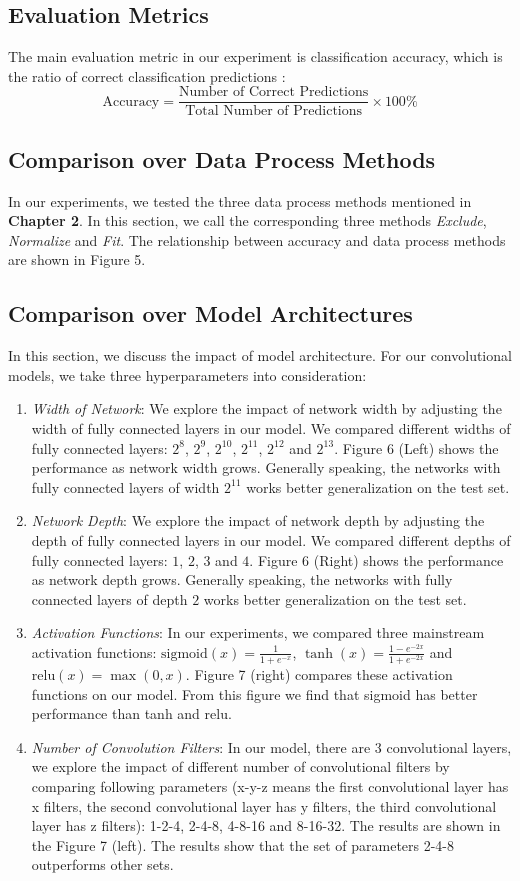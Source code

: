 \documentclass[a4paper, 11pt]{article} %
\begin{document}
\subsection{Evaluation Metrics}
The main evaluation metric in our experiment is classification accuracy, which is the ratio of correct classification predictions :
\[
	\text{Accuracy} = \frac{\text{Number of Correct Predictions}}{\text{Total Number of  Predictions}} \times 100\%
\]
\subsection{Comparison over Data Process Methods}
In our experiments, we tested the three data process methods mentioned in \textbf{Chapter 2}. In this section, we call the corresponding three methods \textit{Exclude}, \textit{Normalize} and \textit{Fit}. The relationship between accuracy and data process methods are shown in Figure 5.
\subsection{Comparison over Model Architectures}
In this section, we discuss the impact of model architecture. For our convolutional models, we take three hyperparameters into consideration:
\begin{enumerate}
	\item \textit{Width of Network}: We explore the impact of network width by adjusting the width of fully connected layers in our model. We compared different widths of fully connected layers:  $2^8$, $2^9$, $2^{10}$, $2^{11}$, $2^{12}$ and $2^{13}$. Figure 6 (Left) shows the performance as network width grows. Generally speaking, the networks with fully connected layers of width $2^{11}$ works better generalization on the test set.
	\item \textit{Network Depth}: We explore the impact of network depth by adjusting the depth of fully connected layers in our model. We compared different depths of fully connected layers:  $1$, $2$, $3$ and $4$. Figure 6 (Right) shows the performance as network depth grows. Generally speaking, the networks with fully connected layers of depth $2$ works better generalization on the test set.

	\item \textit{Activation Functions}: In our experiments, we compared three mainstream activation functions: $\text{sigmoid}(x)=\frac{1}{1+e^{-x}}$, $\tanh(x)=\frac{1-e^{-2x}}{1+e^{-2x}}$ and $\text{relu}(x)=\max(0,x)$. Figure 7 (right) compares these activation functions on our model. From this figure we find that sigmoid has better performance than tanh and relu.
	\item \textit{Number of Convolution Filters}: In our model, there are 3 convolutional layers, we explore the impact of different number of convolutional filters by comparing following parameters (x-y-z means the first convolutional layer has x filters, the second convolutional layer has y filters, the third convolutional layer has z filters): 1-2-4, 2-4-8, 4-8-16 and 8-16-32. The results are shown in the Figure 7 (left). The results show that the set of parameters 2-4-8 outperforms other sets.
	
\end{enumerate}
\end{document}
